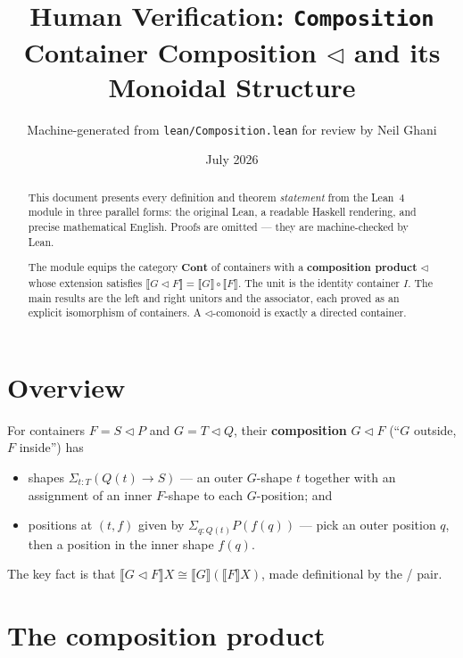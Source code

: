 \documentclass[11pt,a4paper]{article}
\title{Human Verification: \texttt{Composition}\\[4pt]
  \large Container Composition $\triangleleft$ and its Monoidal Structure}
\author{Machine-generated from \texttt{lean/Composition.lean} for review by Neil Ghani}
\date{July 2026}
\begin{document}
\maketitle

\begin{abstract}
This document presents every definition and theorem \emph{statement} from the
Lean~4 module  in three parallel forms: the original Lean,
a readable Haskell rendering, and precise mathematical English.  Proofs are
omitted --- they are machine-checked by Lean.

The module equips the category $\mathbf{Cont}$ of containers with a
\textbf{composition product} $\triangleleft$ whose extension satisfies
$\llbracket G \triangleleft F \rrbracket = \llbracket G \rrbracket \circ
\llbracket F \rrbracket$.  The unit is the identity container $I$.  The main
results are the left and right unitors and the associator, each proved as an
explicit isomorphism of containers.  A $\triangleleft$-comonoid is exactly a
directed container.
\end{abstract}

\tableofcontents
\bigskip

\section{Overview}

For containers $F = S \triangleleft P$ and $G = T \triangleleft Q$, their
\textbf{composition} $G \triangleleft F$ (``$G$ outside, $F$ inside'') has
\begin{itemize}
  \item shapes $\Sigma_{t : T}(Q(t) \to S)$ --- an outer $G$-shape $t$ together
    with an assignment of an inner $F$-shape to each $G$-position; and
  \item positions at $(t, f)$ given by $\Sigma_{q : Q(t)} P(f(q))$ --- pick an
    outer position $q$, then a position in the inner shape $f(q)$.
\end{itemize}

The key fact is that $\llbracket G \triangleleft F \rrbracket X \cong \llbracket
G \rrbracket (\llbracket F \rrbracket X)$, made definitional by the
/ pair.

\section{The composition product}
\end{document}
